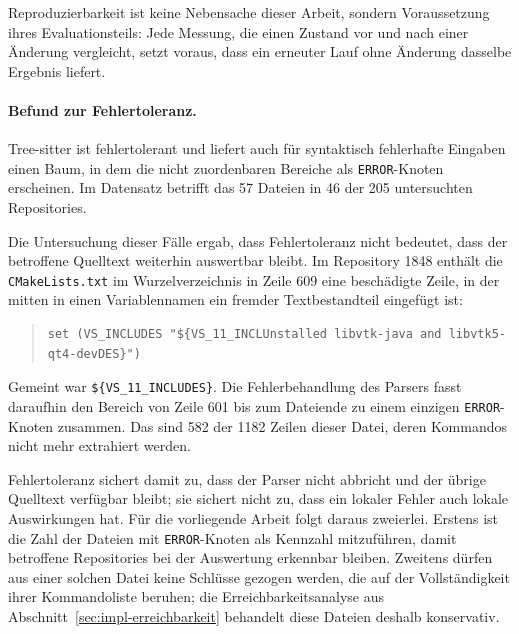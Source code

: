 \documentclass[12pt,a4paper,twoside,headsepline,parskip=half]{scrreprt}
\begin{document}
Reproduzierbarkeit ist keine Nebensache dieser Arbeit, sondern Voraussetzung ihres
Evaluationsteils: Jede Messung, die einen Zustand vor und nach einer Änderung
vergleicht, setzt voraus, dass ein erneuter Lauf ohne Änderung dasselbe Ergebnis
liefert.

\paragraph{Befund zur Fehlertoleranz.}
Tree-sitter ist fehlertolerant und liefert auch für syntaktisch fehlerhafte Eingaben
einen Baum, in dem die nicht zuordenbaren Bereiche als \texttt{ERROR}-Knoten
erscheinen. Im Datensatz betrifft das 57 Dateien in 46 der 205 untersuchten
Repositories.

Die Untersuchung dieser Fälle ergab, dass Fehlertoleranz nicht bedeutet, dass der
betroffene Quelltext weiterhin auswertbar bleibt. Im Repository 1848 enthält die
\texttt{CMakeLists.txt} im Wurzelverzeichnis in Zeile 609 eine beschädigte Zeile, in
der mitten in einen Variablennamen ein fremder Textbestandteil eingefügt ist:

\begin{quote}
\scriptsize
\begin{verbatim}
set (VS_INCLUDES "${VS_11_INCLUnstalled libvtk-java and libvtk5-qt4-devDES}")
\end{verbatim}
\end{quote}

Gemeint war \texttt{\$\{VS\_11\_INCLUDES\}}. Die Fehlerbehandlung des Parsers fasst
daraufhin den Bereich von Zeile 601 bis zum Dateiende zu einem einzigen
\texttt{ERROR}-Knoten zusammen. Das sind 582 der 1182 Zeilen dieser Datei, deren
Kommandos nicht mehr extrahiert werden.

Fehlertoleranz sichert damit zu, dass der Parser nicht abbricht und der übrige
Quelltext verfügbar bleibt; sie sichert nicht zu, dass ein lokaler Fehler auch lokale
Auswirkungen hat. Für die vorliegende Arbeit folgt daraus zweierlei. Erstens ist die
Zahl der Dateien mit \texttt{ERROR}-Knoten als Kennzahl mitzuführen, damit betroffene
Repositories bei der Auswertung erkennbar bleiben. Zweitens dürfen aus einer solchen
Datei keine Schlüsse gezogen werden, die auf der Vollständigkeit ihrer Kommandoliste
beruhen; die Erreichbarkeitsanalyse aus Abschnitt~\ref{sec:impl-erreichbarkeit}
behandelt diese Dateien deshalb konservativ.
\end{document}
